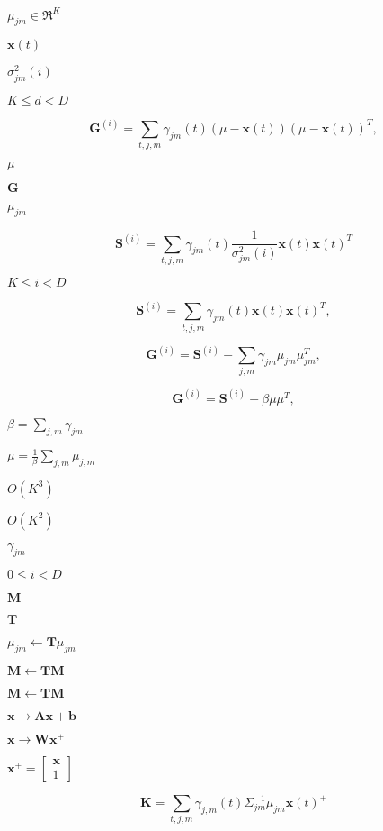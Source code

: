 \documentclass{article}
\begin{document}
$\mu_{jm} \in \Re^{K}$
\pagebreak

$\mathbf{x}(t)$
\pagebreak

$\sigma^2_{jm}(i)$
\pagebreak

$ K \leq d < D$
\pagebreak

\[ \mathbf{G}^{(i)} = \sum_{t,j,m} \gamma_{jm}(t) (\mu - \mathbf{x}(t)) (\mu - \mathbf{x}(t))^T , \]
\pagebreak

$\mu$
\pagebreak

$\mathbf{G}$
\pagebreak

$\mu_{jm}$
\pagebreak

\[ \mathbf{S}^{(i)} = \sum_{t,j,m} \gamma_{jm}(t) \frac{1}{ \sigma^2_{jm}(i) } \mathbf{x}(t) \mathbf{x}(t)^T \]
\pagebreak

$K \leq i < D$
\pagebreak

\[ \mathbf{S}^{(i)} = \sum_{t,j,m} \gamma_{jm}(t) \mathbf{x}(t) \mathbf{x}(t)^T , \]
\pagebreak

\[ \mathbf{G}^{(i)} = \mathbf{S}^{(i)} - \sum_{j,m} \gamma_{jm} \mu_{jm} \mu_{jm}^T , \]
\pagebreak

\[ \mathbf{G}^{(i)} = \mathbf{S}^{(i)} - \beta \mu \mu^T, \]
\pagebreak

$ \beta = \sum_{j,m} \gamma_{jm} $
\pagebreak

$\mu = \frac{1}{\beta} \sum_{j,m} \mu_{j,m}$
\pagebreak

$ O(K^3) $
\pagebreak

$O(K^2)$
\pagebreak

$\gamma_{jm}$
\pagebreak

$ 0 \leq i < D $
\pagebreak

$\mathbf{M}$
\pagebreak

$\mathbf{T}$
\pagebreak

$ \mu_{jm} \leftarrow \mathbf{T} \mu_{jm} $
\pagebreak

$ \mathbf{M} \leftarrow \mathbf{T} \mathbf{M} $
\pagebreak

$\mathbf{M} \leftarrow \mathbf{T} \mathbf{M} $
\pagebreak

$ \mathbf{x} \rightarrow \mathbf{A} \mathbf{x} + \mathbf{b} $
\pagebreak

$ \mathbf{x} \rightarrow \mathbf{W} \mathbf{x}^+ $
\pagebreak

$\mathbf{x}^+ = \left[\begin{array}{c} \mathbf{x} \\ 1 \end{array} \right]$
\pagebreak

\[ \mathbf{K} = \sum_{t,j,m} \gamma_{j,m}(t) \Sigma_{jm}^{-1} \mu_{jm} \mathbf{x}(t)^+ \]
\pagebreak
\end{document}

